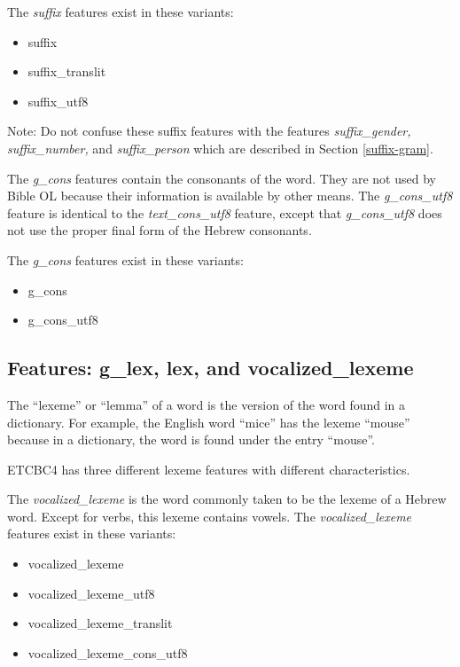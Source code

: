 \documentclass[11pt,oneside,a4paper]{memoir}
\begin{document}
The \emph{suffix} features exist in these variants:

\begin{itemize}
\item suffix
\item suffix\_translit
\item suffix\_utf8
\end{itemize}

Note: Do not confuse these suffix features with the features \emph{suffix\_gender,} \emph{suffix\_number,} and
\emph{suffix\_person} which are described in Section \ref{suffix-gram}.


The \emph{g\_cons} features contain the consonants of the word. They are not used by Bible OL
because their information is available by other means. The \emph{g\_cons\_utf8} feature is identical to
the \emph{text\_cons\_utf8} feature, except that \emph{g\_cons\_utf8} does not use the proper final form
of the Hebrew consonants.


The \emph{g\_cons} features exist in these variants:

\begin{itemize}
\item g\_cons
\item g\_cons\_utf8
\end{itemize}


\subsection{Features: g\_lex, lex, and vocalized\_lexeme}

The ``lexeme'' or ``lemma'' of a word is the version of the word found in a dictionary. For example,
the English word ``mice'' has the lexeme ``mouse'' because in a dictionary, the word is found under
the entry ``mouse''.

ETCBC4 has three different lexeme features with different characteristics.

The \emph{vocalized\_lexeme} is the word commonly taken to be the lexeme of a Hebrew word. Except
for verbs, this lexeme contains vowels. The \emph{vocalized\_lexeme} features exist in these variants:

\begin{itemize}
\item vocalized\_lexeme
\item vocalized\_lexeme\_utf8
\item vocalized\_lexeme\_translit
\item vocalized\_lexeme\_cons\_utf8
\end{itemize}
\end{document}
